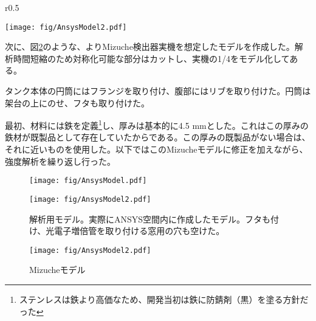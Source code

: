\documentclass[11pt]{ltjsreport}
\newcommand{\figref}[1]{図\ref{#1}}
\begin{document}
\begin{wrapfigure}{r}{0.5\textwidth}
\begin{center}
\texttt{[image: fig/AnsysModel2.pdf]}
\caption[``Mizuche''モデル]{``Mizuche''モデル。}
\label{AnsysModel3}
\end{center}
\end{wrapfigure}
\fi

次に、\figref{AnsysModel3}のような、よりMizuche検出器実機を想定したモデルを作成した。解析時間短縮のため対称化可能な部分はカットし、実機の1/4をモデル化してある。

タンク本体の円筒にはフランジを取り付け、腹部にはリブを取り付けた。円筒は架台の上にのせ、フタも取り付けた。

最初、材料には鉄を定義\footnote{ステンレスは鉄より高価なため、開発当初は鉄に防錆剤（黒）を塗る方針だった}し、厚みは基本的に4.5 mmとした。これはこの厚みの鉄材が既製品として存在していたからである。この厚みの既製品がない場合は、それに近いものを使用した。以下ではこのMizucheモデルに修正を加えながら、強度解析を繰り返し行った。

\begin{figure}[htbp]
\begin{minipage}{0.47\textwidth}
\begin{center}
\texttt{[image: fig/AnsysModel.pdf]}
\caption[強度解析モデルのスケッチ]{強度解析モデルのスケッチ}
\label{AnsysModel}
\end{center}
\end{minipage}
\begin{minipage}{0.47\textwidth}
\begin{center}
\texttt{[image: fig/AnsysModel2.pdf]}
\caption[強度解析モデル]{解析用モデル。実際にANSYS空間内に作成したモデル。フタも付け、光電子増倍管を取り付ける窓用の穴も空けた。}
\label{AnsysModel2}
\end{center}
\end{minipage}
\end{figure}
\fi %

\begin{figure}[htbp]
\begin{center}
\texttt{[image: fig/AnsysModel2.pdf]}
\caption[Mizucheモデル]{Mizucheモデル}
\label{AnsysModel3}
\end{center}
\end{figure}
\end{document}

